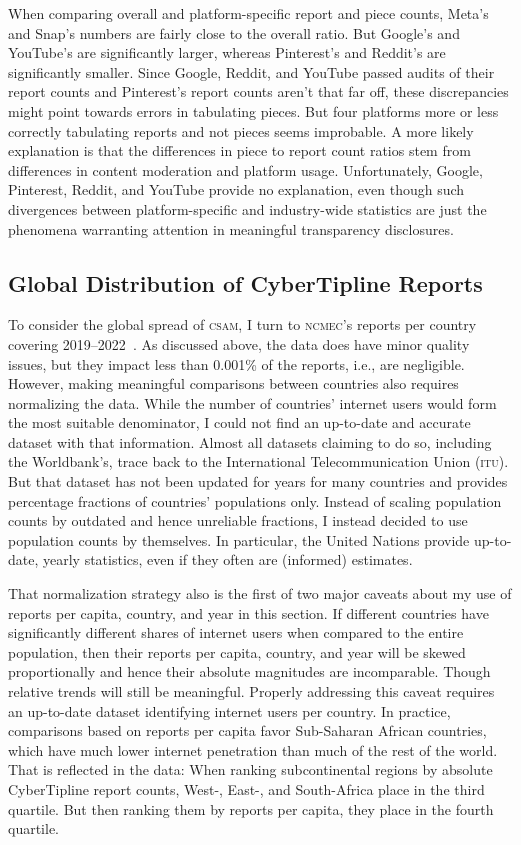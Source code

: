 \documentclass[nonacm,screen]{acmart}
\newcommand\V[1]{\textsc{\MakeLowercase{#1}}}
\begin{document}
When comparing overall and platform-specific report and piece counts, Meta's and
Snap's numbers are fairly close to the overall ratio. But Google's and YouTube's
are significantly larger, whereas Pinterest's and Reddit's are significantly
smaller. Since Google, Reddit, and YouTube passed audits of their report counts
and Pinterest's report counts aren't that far off, these discrepancies might
point towards errors in tabulating pieces. But four platforms more or less
correctly tabulating reports and not pieces seems improbable. A more likely
explanation is that the differences in piece to report count ratios stem from
differences in content moderation and platform usage. Unfortunately, Google,
Pinterest, Reddit, and YouTube provide no explanation, even though such
divergences between platform-specific and industry-wide statistics are just the
phenomena warranting attention in meaningful transparency disclosures.


\subsection{Global Distribution of CyberTipline Reports}
\label{sec:spread}

To consider the global spread of \V{CSAM}, I turn to \V{NCMEC}'s reports per
country covering 2019--2022~\cite{NcmecByCountry2019,NcmecByCountry2020,
NcmecByCountry2021,NcmecByCountry2020}. As discussed above, the data does have
minor quality issues, but they impact less than 0.001\% of the reports, i.e.,
are negligible. However, making meaningful comparisons between countries also
requires normalizing the data. While the number of countries' internet users
would form the most suitable denominator, I could not find an up-to-date and
accurate dataset with that information. Almost all datasets claiming to do so,
including the Worldbank's, trace back to the International Telecommunication
Union (\V{ITU}). But that dataset has not been updated for years for many
countries and provides percentage fractions of countries' populations only.
Instead of scaling population counts by outdated and hence unreliable fractions,
I instead decided to use population counts by themselves. In particular, the
United Nations provide up-to-date, yearly statistics, even if they often are
(informed) estimates.

That normalization strategy also is the first of two major caveats about my use
of reports per capita, country, and year in this section. If different countries
have significantly different shares of internet users when compared to the
entire population, then their reports per capita, country, and year will be
skewed proportionally and hence their absolute magnitudes are incomparable.
Though relative trends will still be meaningful. Properly addressing this caveat
requires an up-to-date dataset identifying internet users per country. In
practice, comparisons based on reports per capita favor Sub-Saharan African
countries, which have much lower internet penetration than much of the rest of
the world. That is reflected in the data: When ranking subcontinental regions by
absolute CyberTipline report counts, West-, East-, and South-Africa place in the
third quartile. But then ranking them by reports per capita, they place in the
fourth quartile.
\end{document}

